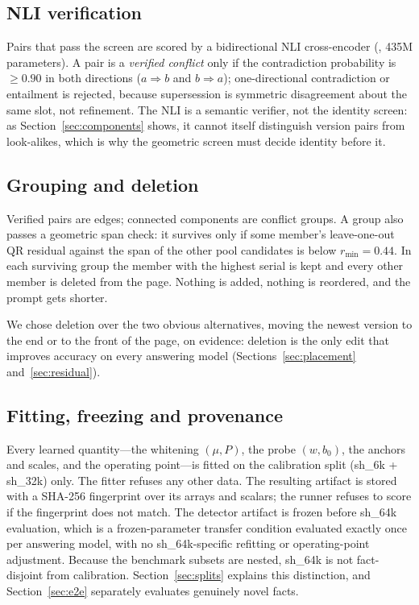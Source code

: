 \documentclass[journal=jcisd8,manuscript=article]{achemso}
\begin{document}
\subsection{NLI verification}
\label{sec:nli}

Pairs that pass the screen are scored by a bidirectional NLI cross-encoder (, 435M parameters). A pair is a \emph{verified conflict} only if the contradiction probability is $\geq0.90$ in both directions ($a\Rightarrow b$ and $b\Rightarrow a$); one-directional contradiction or entailment is rejected, because supersession is symmetric disagreement about the same slot, not refinement. The NLI is a semantic verifier, not the identity screen: as Section~\ref{sec:components} shows, it cannot itself distinguish version pairs from look-alikes, which is why the geometric screen must decide identity before it.

\subsection{Grouping and deletion}
\label{sec:group}

Verified pairs are edges; connected components are conflict groups. A group also passes a geometric span check: it survives only if some member's leave-one-out QR residual against the span of the other pool candidates is below $r_{\min}=0.44$. In each surviving group the member with the highest serial is kept and every other member is deleted from the page. Nothing is added, nothing is reordered, and the prompt gets shorter.

We chose deletion over the two obvious alternatives, moving the newest version to the end or to the front of the page, on evidence: deletion is the only edit that improves accuracy on every answering model (Sections~\ref{sec:placement} and~\ref{sec:residual}).

\subsection{Fitting, freezing and provenance}

Every learned quantity---the whitening $(\mu,P)$, the probe $(w,b_0)$, the anchors and scales, and the operating point---is fitted on the calibration split (sh\_6k + sh\_32k) only. The fitter refuses any other data. The resulting artifact is stored with a SHA-256 fingerprint over its arrays and scalars; the runner refuses to score if the fingerprint does not match. The detector artifact is frozen before sh\_64k evaluation, which is a frozen-parameter transfer condition evaluated exactly once per answering model, with no sh\_64k-specific refitting or operating-point adjustment. Because the benchmark subsets are nested, sh\_64k is not fact-disjoint from calibration. Section~\ref{sec:splits} explains this distinction, and Section~\ref{sec:e2e} separately evaluates genuinely novel facts.
\end{document}
